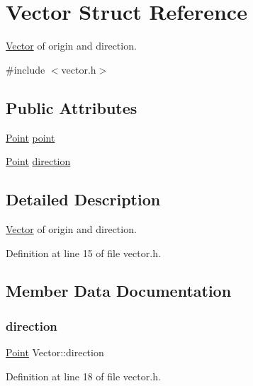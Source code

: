 \hypertarget{struct_vector}{}\section{Vector Struct Reference}
\label{struct_vector}


\mbox{\hyperlink{struct_vector}{Vector}} of origin and direction.  




{\ttfamily \#include $<$vector.\+h$>$}

\subsection*{Public Attributes}
\begin{DoxyCompactItemize}
\item 
\mbox{\hyperlink{vector_8h_ac82aba4f8f70541442a30f1598bd0649}{Point}} \mbox{\hyperlink{struct_vector_a816252f9d4aa9c0c0d554449ebf8fe9d}{point}}
\item 
\mbox{\hyperlink{vector_8h_ac82aba4f8f70541442a30f1598bd0649}{Point}} \mbox{\hyperlink{struct_vector_a05eed7791755ca926100871dc3faed95}{direction}}
\end{DoxyCompactItemize}


\subsection{Detailed Description}
\mbox{\hyperlink{struct_vector}{Vector}} of origin and direction. 

Definition at line 15 of file vector.\+h.



\subsection{Member Data Documentation}
\mbox{\label{struct_vector_a05eed7791755ca926100871dc3faed95}} 
\subsubsection{\texorpdfstring{direction}{direction}}
{\footnotesize\ttfamily \mbox{\hyperlink{vector_8h_ac82aba4f8f70541442a30f1598bd0649}{Point}} Vector\+::direction}



Definition at line 18 of file vector.\+h.

